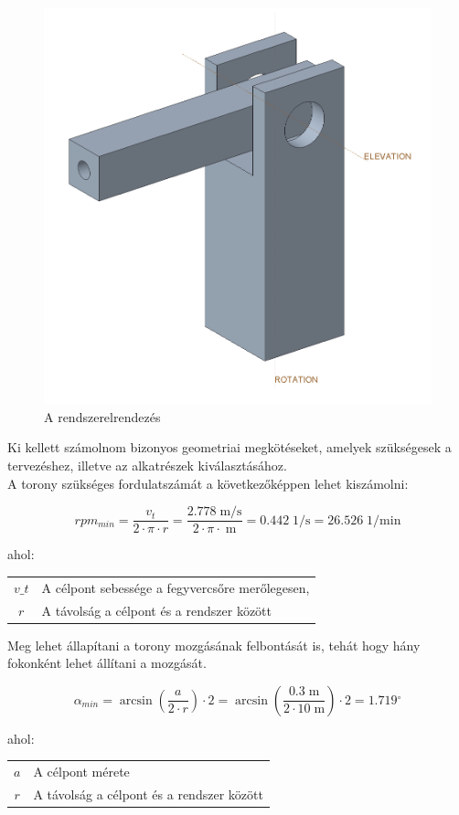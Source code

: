 \documentclass[12pt,a4paper]{article}
\newcommand{\w}[1]{\; \mathrm{#1}}
\begin{document}
\begin{figure}[h!]
	\centering
	\includegraphics[width=0.6\linewidth]{mockup}
	\caption{A rendszerelrendezés}
	\label{fig:megval_mockup}
\end{figure}

Ki kellett számolnom bizonyos geometriai megkötéseket, amelyek szükségesek a tervezéshez, illetve az alkatrészek kiválasztásához. \\

A torony szükséges fordulatszámát a következőképpen lehet kiszámolni:


\begin{equation}
	rpm_{min} = \frac{v_t}{2 \cdot \pi \cdot r} = \frac{2.778 \w{m/s}}{2 \cdot \pi \cdot \w{m}} = 0.442 \w{1/s} = 26.526 \w{1/min}
\end{equation}

ahol:

\begin{tabular}{cl}
	$v\_t$ & A célpont sebessége a fegyvercsőre merőlegesen, \\
	$r$ & A távolság a célpont és a rendszer között\\
\end{tabular}

Meg lehet állapítani a torony mozgásának felbontását is, tehát hogy hány fokonként lehet állítani a mozgását.

\begin{equation}
	\alpha_{min} = \arcsin\left(\frac{a}{2 \cdot r}\right) \cdot 2 = \arcsin\left(\frac{0.3 \w{m}}{2 \cdot 10 \w{m}}\right) \cdot 2 = 1.719 {^\circ}
\end{equation}

ahol:

\begin{tabular}{cl}
	$a$ & A célpont mérete  \\
	$r$ & A távolság a célpont és a rendszer között\\
\end{tabular}
\end{document}
